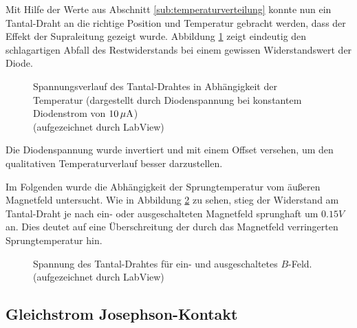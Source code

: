 		Mit Hilfe der Werte aus Abschnitt \ref{sub:temperaturverteilung} konnte nun ein Tantal-Draht an die richtige Position und Temperatur gebracht werden, dass der Effekt der Supraleitung gezeigt wurde.
		Abbildung \ref{widerstandsabfall} zeigt eindeutig den schlagartigen Abfall des Restwiderstands bei einem gewissen Widerstandswert der Diode.
		\begin{figure}
			
			\caption{Spannungsverlauf des Tantal-Drahtes in Abhängigkeit der Temperatur (dargestellt durch Diodenspannung bei konstantem Diodenstrom von $10\, \text{$\mu$A}$) \\ (aufgezeichnet durch LabView) }
			\label{widerstandsabfall}
		\end{figure}
		Die Diodenspannung wurde invertiert und mit einem Offset versehen, um den qualitativen Temperaturverlauf besser darzustellen.
		\par
		Im Folgenden wurde die Abhängigkeit der Sprungtemperatur vom äußeren Magnetfeld untersucht.
		Wie in Abbildung \ref{gap} zu sehen, stieg der Widerstand am Tantal-Draht je nach ein- oder ausgeschalteten Magnetfeld sprunghaft um $0.15\unit{V}$ an.
		Dies deutet auf eine Überschreitung der durch das Magnetfeld verringerten Sprungtemperatur hin.
		\begin{figure}
			
			\caption{Spannung des Tantal-Drahtes für ein- und ausgeschaltetes $B$-Feld. \\ (aufgezeichnet durch LabView)}
			\label{gap}
		\end{figure}



	\subsection{Gleichstrom Josephson-Kontakt} %
	\label{sub:gleichstrom_josephson_kontakt}
	
